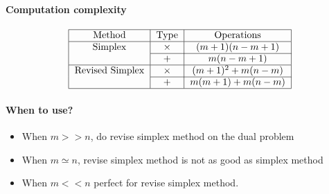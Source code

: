                 \paragraph{Computation complexity}
                    \begin{align}
                        \begin{tabular}{|c|c|c|}
                            \hline Method & Type & Operations\\
                            \hline Simplex & $\times$ & $(m+1)(n-m+1)$\\
                            \cline{2-3} & $+$ & $m(n-m+1)$\\
                            \hline Revised Simplex & $\times$ & $(m+1)^2+m(n-m)$ \\
                            \cline{2-3} & $+$ & $m(m+1)+m(n-m)$ \\
                            \hline
                        \end{tabular} \nonumber
                    \end{align}

                \paragraph{When to use?}
                    \begin{itemize}
                        \item When $m >> n$, do revise simplex method on the dual problem
                        \item When $m \simeq n$, revise simplex method is not as good as simplex method
                        \item When $m << n$ perfect for revise simplex method.
                    \end{itemize}
                            
